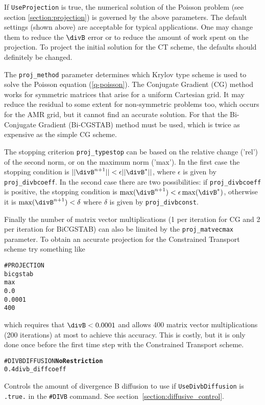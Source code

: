 If {\tt UseProjection} is true, the numerical solution of the Poisson 
problem (see section \ref{section:projection}) is governed by the above parameters.
The default settings (shown above) are acceptable for typical applications.
One may change them to reduce the $\divB$ error or to reduce
the amount of work spent on the projection. 
To project the initial solution for the CT scheme,
the defaults should definitely be changed.

The {\tt proj\_method} parameter determines which Krylov type scheme is used
to solve the Poisson equation (\ref{q-poisson}). The Conjugate Gradient (CG) 
\cite{hestenes-stiefel}
method works for symmetric matrices that arise for a uniform Cartesian grid.
It may reduce the residual to some extent for non-symmetric problems too,
which occurs for the AMR grid, but it cannot find an accurate solution.
For that the Bi-Conjugate Gradient (Bi-CGSTAB) method 
\cite{vandervorst}
must be used, which is twice as expensive as the simple CG scheme.

The stopping criterion {\tt proj\_typestop} can be based on the relative change
('rel') of the second norm, or on the maximum norm ('max'). In the first
case the stopping condition is $||\divB^{n+1}||<\epsilon||\divB^*||$,
where $\epsilon$ is given by {\tt proj\_divbcoeff}. 
In the second case there are
two possibilities: if {\tt proj\_divbcoeff} is positive, the stopping condition
is $\max(\divB^{n+1})<\epsilon\max(\divB^*)$, otherwise it is
$\max(\divB^{n+1})<\delta$ where $\delta$ is given by {\tt proj\_divbconst}. 

Finally the number of matrix vector multiplications (1 per iteration for CG
and 2 per iteration for BiCGSTAB) can also be limited by the 
{\tt proj\_matvecmax} parameter. To obtain an accurate projection 
for the Constrained Transport scheme try something like
\begin{verbatim}
#PROJECTION
bicgstab
max
0.0
0.0001
400
\end{verbatim}
which requires that $\divB<0.0001$ and allows 400 matrix vector multiplications
(200 iterations) at most to achieve this accuracy. This is costly, but it is
only done once before the first time step with the Constrained Transport 
scheme.
\ \ \\

\begin{alltt}
#DIVBDIFFUSION   \hfill   {\bf No Restriction}
0.4                    divb_diffcoeff  
\end{alltt}

Controls the amount  of divergence B diffusion to use if {\tt UseDivbDiffusion}
is {\tt .true.} in the {\tt \#DIVB} command.
See section~\ref{section:diffusive_control}.
\ \ \\

